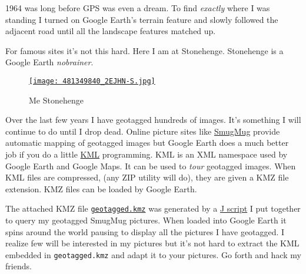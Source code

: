 1964 was long before GPS was even a dream. To find \emph{exactly} where
I was standing I turned on Google Earth's terrain feature and slowly
followed the adjacent road until all the landscape features matched up.

For famous sites it's not this hard. Here I am at Stonehenge. Stonehenge
is a Google Earth \emph{nobrainer}.


\begin{figure}[htbp]
\centering
\href{http://conceptcontrol.smugmug.com/Themes/Diaries/Been-There-Done-That-1/7414505\_n9vNC\#481349840\_2EJHN}{\texttt{[image: 481349840\_2EJHN-S.jpg]}}
\caption{Me  Stonehenge}
\label{fig:119X1}
\end{figure}



Over the last few years I have geotagged hundreds of images. It's
something I will continue to do until I drop dead. Online picture sites
like \href{http://www.smugmug.com/}{SmugMug} provide automatic mapping
of geotagged images but Google Earth does a much better job if you do a
little
\href{http://code.google.com/apis/kml/documentation/kml\_tut.html}{KML}
programming. KML is an XML namespace used by Google Earth and Google
Maps. It can be used to \emph{tour} geotagged images. When KML files are
compressed, (any ZIP utility will do), they are given a KMZ file
extension. KMZ files can be loaded by Google Earth.

The attached KMZ file
\href{https://github.com/bakerjd99/jacks/blob/master/geotagged/geotagged.kmz}{\texttt{geotagged.kmz}} was generated
by a \href{https://github.com/bakerjd99/jacks/blob/master/geotagged/kml.ijs}{J script} I put
together to query my geotagged SmugMug pictures. When loaded into Google
Earth it spins around the world pausing to display all the pictures I
have geotagged. I realize few will be interested in my pictures but it's
not hard to extract the KML embedded in \texttt{geotagged.kmz} and adapt
it to your pictures. Go forth and hack my friends.

